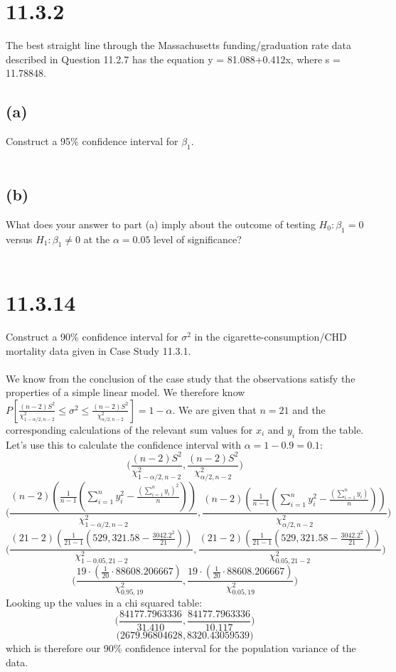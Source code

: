 \documentclass{article}
\begin{document}
{\section*{11.3.2}
The best straight line through the Massachusetts funding/graduation rate data described in Question 11.2.7
has the equation y = 81.088+0.412x, where s = 11.78848.

\subsection*{(a)} 
Construct a 95\% confidence interval for \(\beta_1\).
\\
\\


\subsection*{(b)}
What does your answer to part (a) imply about the outcome of testing \(H_0: \beta_1 = 0\) versus \(H_1: \beta_1 \neq 0\) at the \(\alpha = 0.05\) level of significance?
\\
\\


\section*{11.3.14}
Construct a 90\% confidence interval for \(\sigma^2\) in the cigarette-consumption/CHD mortality data given in Case Study 11.3.1.
\\
\\
We know from the conclusion of the case study that the observations satisfy the properties of a simple linear model. We therefore know \(P[\frac{(n-2)S^2}{\chi^2_{1-\alpha / 2, n-2}} \leq \sigma^2 \leq \frac{(n-2)S^2}{\chi^2_{\alpha / 2, n-2}}] = 1 - \alpha\). We are given that \(n=21\) and the corresponding calculations of the relevant sum values for \(x_i\) and \(y_i\) from the table. Let's use this to calculate the confidence interval with \(\alpha = 1 - 0.9 = 0.1\): 
\[
\big(\frac{(n-2)S^2}{\chi^2_{1-\alpha / 2, n-2}}, \frac{(n-2)S^2}{\chi^2_{\alpha / 2, n-2}}\big)
\]
\[
\big(\frac{(n-2)(\frac{1}{n-1}(\sum_{i=1}^{n}y_i^2 - \frac{(\sum_{i=1}^{n}y_i)^2}{n}))}{\chi^2_{1-\alpha / 2, n-2}}, \frac{(n-2)(\frac{1}{n-1}(\sum_{i=1}^{n}y_i^2 - \frac{(\sum_{i=1}^{n}y_i)}{n}))}{\chi^2_{\alpha / 2, n-2}}\big)
\]
\[
\big(\frac{(21-2)(\frac{1}{21-1} (529,321.58 - \frac{3042.2^2}{21}))}{\chi^2_{1 - 0.05, 21-2}}, \frac{(21-2)(\frac{1}{21-1} (529,321.58 - \frac{3042.2^2}{21}))}{\chi^2_{0.05, 21-2}}\big)
\]
\[
\big(\frac{19 \cdot (\frac{1}{20} \cdot 88608.206667)}{\chi^2_{0.95, 19}}, \frac{19 \cdot (\frac{1}{20} \cdot 88608.206667)}{\chi^2_{0.05, 19}}\big)
\]
Looking up the values in a chi squared table:
\[
\big(\frac{84177.7963336}{31.410}, \frac{84177.7963336}{10.117}\big)
\]
\[
\big(2679.96804628, 8320.43059539 \big)
\]
which is therefore our 90\% confidence interval for the population variance of the data.

}
\end{document}
